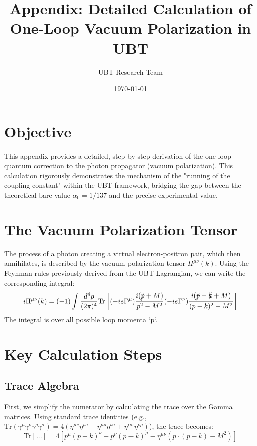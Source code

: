 \documentclass[12pt, a4paper]{article}
\title{\textbf{Appendix: Detailed Calculation of One-Loop Vacuum Polarization in UBT}}
\author{UBT Research Team}
\date{\today}
\begin{document}
\maketitle

\section{Objective}
This appendix provides a detailed, step-by-step derivation of the one-loop quantum correction to the photon propagator (vacuum polarization). This calculation rigorously demonstrates the mechanism of the "running of the coupling constant" within the UBT framework, bridging the gap between the theoretical bare value \( \alpha_0 = 1/137 \) and the precise experimental value.

\section{The Vacuum Polarization Tensor}
The process of a photon creating a virtual electron-positron pair, which then annihilates, is described by the vacuum polarization tensor \( \Pi^{\mu\nu}(k) \). Using the Feynman rules previously derived from the UBT Lagrangian, we can write the corresponding integral:
\begin{equation}
    i\Pi^{\mu\nu}(k) = (-1) \int \frac{d^4p}{(2\pi)^4} \text{Tr} \left[ (-ie\Gamma^\mu) \frac{i(\slashed{p} + M)}{p^2 - M^2} (-ie\Gamma^\nu) \frac{i(\slashed{p} - \slashed{k} + M)}{(p-k)^2 - M^2} \right]
    \label{eq:integral}
\end{equation}
The integral is over all possible loop momenta `p`.

\section{Key Calculation Steps}

\subsection{Trace Algebra}
First, we simplify the numerator by calculating the trace over the Gamma matrices. Using standard trace identities (e.g., \( \text{Tr}(\gamma^\mu \gamma^\nu \gamma^\rho \gamma^\sigma) = 4(\eta^{\mu\nu}\eta^{\rho\sigma} - \eta^{\mu\rho}\eta^{\nu\sigma} + \eta^{\mu\sigma}\eta^{\nu\rho}) \)), the trace becomes:
\begin{equation}
    \text{Tr}[...] = 4 \left[ p^\mu(p-k)^\nu + p^\nu(p-k)^\mu - \eta^{\mu\nu}(p \cdot (p-k) - M^2) \right]
\end{equation}
\end{document}
